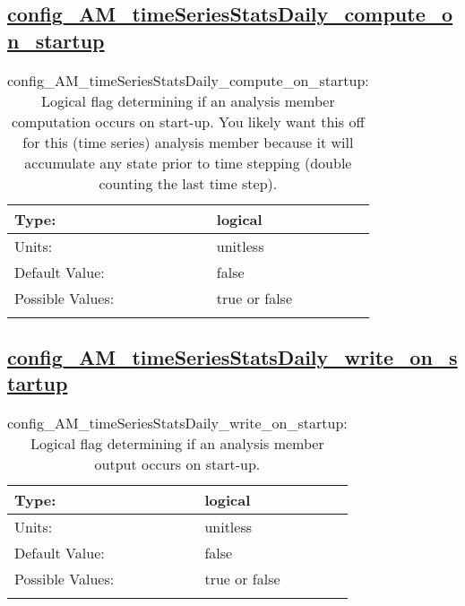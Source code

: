 \subsection[config\_AM\_timeSeriesStatsDaily\_compute\_on\_startup]{\hyperref[sec:nm_tab_AM_timeSeriesStatsDaily]{config\_AM\_timeSeriesStatsDaily\_compute\_on\_startup}}
\label{subsec:nm_sec_config_AM_timeSeriesStatsDaily_compute_on_startup}
\begin{center}
\begin{longtable}{| p{2.0in} || p{4.0in} |}
    \hline
    Type: & logical \\
    \hline
    Units: & \si{unitless} \\
    \hline
    Default Value: & false \\
    \hline
    Possible Values: & true or false \\
    \hline
    \caption{config\_AM\_timeSeriesStatsDaily\_compute\_on\_startup: Logical flag determining if an analysis member computation occurs on start-up. You likely want this off for this (time series) analysis member because it will accumulate any state prior to time stepping (double counting the last time step).}
\end{longtable}
\end{center}
\subsection[config\_AM\_timeSeriesStatsDaily\_write\_on\_startup]{\hyperref[sec:nm_tab_AM_timeSeriesStatsDaily]{config\_AM\_timeSeriesStatsDaily\_write\_on\_startup}}
\label{subsec:nm_sec_config_AM_timeSeriesStatsDaily_write_on_startup}
\begin{center}
\begin{longtable}{| p{2.0in} || p{4.0in} |}
    \hline
    Type: & logical \\
    \hline
    Units: & \si{unitless} \\
    \hline
    Default Value: & false \\
    \hline
    Possible Values: & true or false \\
    \hline
    \caption{config\_AM\_timeSeriesStatsDaily\_write\_on\_startup: Logical flag determining if an analysis member output occurs on start-up.}
\end{longtable}
\end{center}
